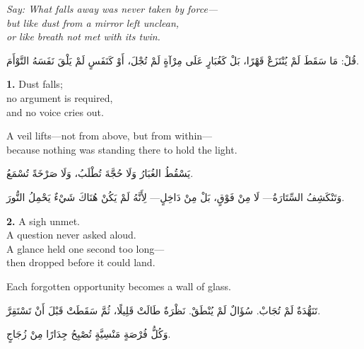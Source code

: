 \documentclass[11pt,a4paper,twoside]{book}
\begin{document}
\vspace{1em}
\begin{center}
\begin{minipage}{0.85\textwidth}
\itshape Say: What falls away was never taken by force—\\
but like dust from a mirror left unclean,\\
or like breath not met with its twin.
\end{minipage}
\end{center}
\begin{center}
\begin{minipage}{0.85\textwidth}
\begin{flushright}
{\arabicfont قُلْ: مَا سَقَطَ لَمْ يُنْتَزَعْ قَهْرًا،
بَلْ كَغُبَارٍ عَلَى مِرْآةٍ لَمْ تُجْلَ،
أَوْ كَنَفَسٍ لَمْ يَلْقَ نَفَسَهُ التَّوْأَمَ.}
\end{flushright}
\end{minipage}
\end{center}
\vspace{1em}

{\color{indigo}\bfseries 1.}\quad
Dust falls;\\
no argument is required,\\
and no voice cries out.

A veil lifts—not from above, but from within—\\
because nothing was standing there to hold the light.

\begin{flushright}
{\arabicfont
يَسْقُطُ الغُبَارُ وَلَا حُجَّةَ تُطْلَبُ،
وَلَا صَرْخَةً تُسْمَعُ.

وَتَنْكَشِفُ السِّتَارَةُ—
لَا مِنْ فَوْقٍ، بَلْ مِنْ دَاخِلٍ—
لِأَنَّهُ لَمْ يَكُنْ هُنَاكَ شَيْءٌ
يَحْمِلُ النُّورَ.}
\end{flushright}

\vspace{1em}
{\color{indigo}\bfseries 2.}\quad
A sigh unmet.\\
A question never asked aloud.\\
A glance held one second too long—\\
then dropped before it could land.

Each forgotten opportunity becomes a wall of glass.

\begin{flushright}
{\arabicfont
تَنَهُّدَةٌ لَمْ تُجَابْ.
سُؤَالٌ لَمْ يُنْطَقْ.
نَظْرَةٌ طَالَتْ قَلِيلًا،
ثُمَّ سَقَطَتْ قَبْلَ أَنْ تَسْتَقِرَّ.

وَكُلُّ فُرْصَةٍ مَنْسِيَّةٍ
تُصْبِحُ جِدَارًا مِنْ زُجَاجٍ.}
\end{flushright}
\end{document}
